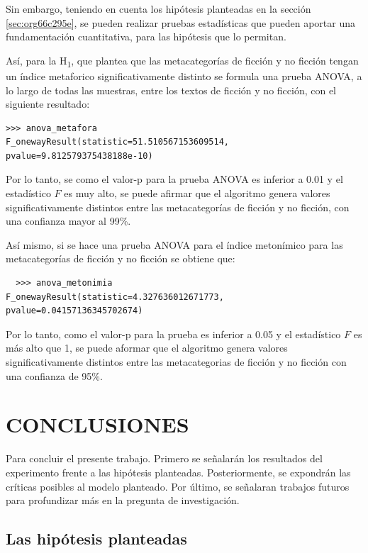 \documentclass[12pt,letterpaper,twoside]{article}
\begin{document}
Sin embargo, teniendo en cuenta los hipótesis planteadas en la sección \ref{sec:org66c295e},
se pueden realizar pruebas estadísticas que pueden aportar una fundamentación cuantitativa,
para las hipótesis que lo permitan.

Así, para la H\textsubscript{1}, que plantea que las metacategorías de ficción y no ficción tengan un
índice metaforico significativamente distinto se formula una prueba ANOVA, a lo largo de
todas las muestras, entre los textos de ficción y no ficción, con el siguiente resultado:

\begin{verbatim}
>>> anova_metafora
F_onewayResult(statistic=51.510567153609514, pvalue=9.812579375438188e-10)

\end{verbatim}

Por lo tanto, se como el valor-p para la prueba ANOVA es inferior a 0.01 y
el estadístico \(F\) es muy alto, se puede afirmar que el algoritmo genera valores
significativamente distintos entre las metacategorías de ficción y no ficción,
con una confianza mayor al 99\%.

Así mismo, si se hace una prueba ANOVA para el índice metonímico para las
metacategorías de ficción y no ficción se obtiene que:


\begin{verbatim}
  >>> anova_metonimia
F_onewayResult(statistic=4.327636012671773, pvalue=0.04157136345702674)

\end{verbatim}

Por lo tanto, como el valor-p para la prueba es inferior a 0.05 y el estadístico
\(F\) es más alto que 1, se puede aformar que el algoritmo genera valores
significativamente distintos entre las metacategorias de ficción y no ficción
con una confianza de 95\%.


\section{CONCLUSIONES}
\label{sec:org1fd21e8}

Para concluir el presente trabajo. Primero se señalarán los
resultados del experimento frente a las hipótesis planteadas.
Posteriormente, se expondrán las críticas posibles al modelo
planteado. Por último, se señalaran trabajos futuros para profundizar
más en la pregunta de investigación.

\subsection{Las hipótesis planteadas}
\label{sec:orge2b754b}
\end{document}
